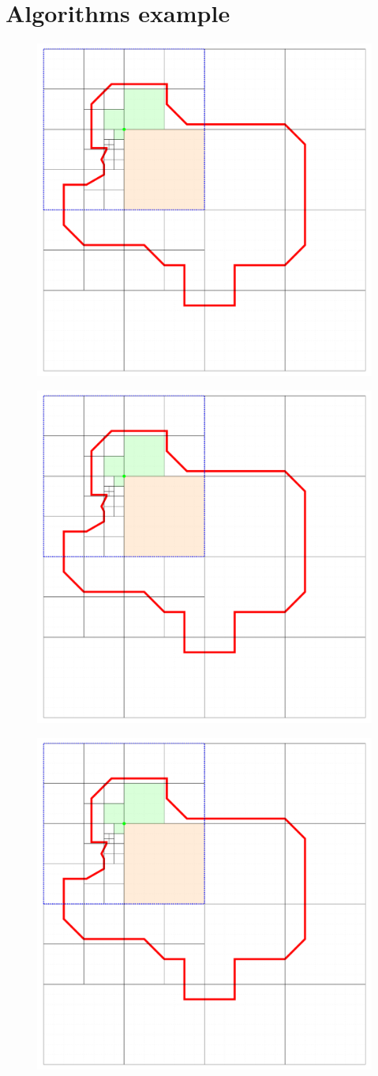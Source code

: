 \documentclass{article}
\begin{document}
    \section*{Algorithms example}
    \begin{figure}[!ht]
        \centering
        \includegraphics[page=1, width=0.55\linewidth]{Figures/Example}
    \end{figure}
    \begin{figure}[!ht]
        \centering
        \includegraphics[page=2, width=0.55\linewidth]{Figures/Example}
    \end{figure}
    \begin{figure}[!ht]
        \centering
        \includegraphics[page=3, width=0.55\linewidth]{Figures/Example}
    \end{figure}
\end{document}
